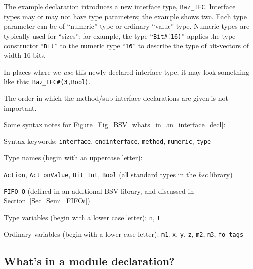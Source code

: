 The example declaration introduces a new interface type,
\verb|Baz_IFC|.  Interface types may or may not have type parameters;
the example shows two.  Each type parameter can be of ``numeric'' type
or ordinary ``value'' type.  Numeric types are typically used for
``sizes''; for example, the type ``\verb|Bit#(16)|'' applies the type
constructor ``\verb|Bit|'' to the numeric type ``\verb|16|'' to
describe the type of bit-vectors of width 16 bits.

In places where we \emph{use} this newly declared interface type, it
may look something like this: \verb|Baz_IFC#(3,Bool)|.

The order in which the method/sub-interface declarations are given is
not important.

Some syntax notes for Figure~\ref{Fig_BSV_whats_in_an_interface_decl}:
\begin{tightlist}

 \item Syntax keywords: \verb|interface|, \verb|endinterface|,
       \verb|method|, \verb|numeric|, \verb|type|

 \item Type names (begin with an uppercase letter):
  \begin{tightlist}

   \item \verb|Action|, \verb|ActionValue|, \verb|Bit|, \verb|Int|,
         \verb|Bool| (all standard types in the \emph{bsc} library)

   \item \verb|FIFO_O| (defined in an additional BSV library,
          and discussed in Section~\ref{Sec_Semi_FIFOs})
  \end{tightlist}

 \item Type variables (begin with a lower case letter): \verb|n|, \verb|t|

 \item Ordinary variables (begin with a lower case letter): \verb|m1|,
       \verb|x|, \verb|y|, \verb|z|, \verb|m2|, \verb|m3|,
       \verb|fo_tags|

\end{tightlist}


\subsection{What's in a module declaration?}

